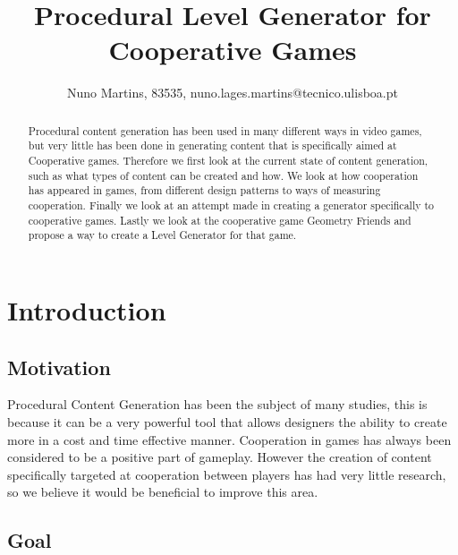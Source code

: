\documentclass[runningheads]{llncs}
\begin{document}
\title{Procedural Level Generator for Cooperative Games}

\author{Nuno Martins, 83535, nuno.lages.martins@tecnico.ulisboa.pt }


{\def\addcontentsline#1#2#3{}\maketitle}

\begin{abstract}
Procedural content generation has been used in many different ways in video games, but very little has been done in generating content that is specifically aimed at Cooperative games. Therefore we first look at the current state of content generation, such as what types of content can be created and how. We look at how cooperation has appeared in games, from different design patterns to ways of measuring cooperation. Finally we look at an attempt made in creating a generator specifically to cooperative games. Lastly we look at the cooperative game Geometry Friends and propose a way to create a Level Generator for that game.

\end{abstract}


\tableofcontents
\newpage

\section{Introduction}


\subsection{Motivation}
Procedural Content Generation has been the subject of many studies, this is because it can be a very powerful tool that allows designers the ability to create more in a cost and time effective manner. Cooperation in games has always been considered to be a positive part of gameplay. However the creation of content specifically targeted at cooperation between players has had very little research, so we believe it would be beneficial to improve this area.

\subsection{Goal}
\end{document}
